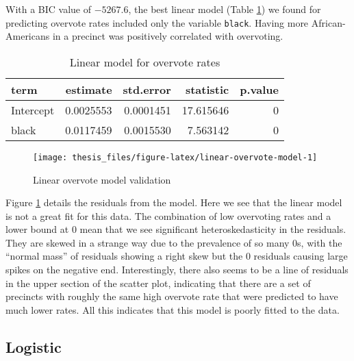 \documentclass[12pt,twoside]{reedthesis}
\begin{document}
With a BIC value of \(-5267.6\), the best linear model (Table \ref{tab:linear-overvote-model}) we found for predicting overvote rates included only the variable \texttt{black}. Having more African-Americans in a precinct was positively correlated with overvoting.
\begin{table}[t]

\caption[Linear overvote model]{\label{tab:linear-overvote-model}Linear model for overvote rates}
\centering
\begin{tabular}{lrrrr}
\toprule
term & estimate & std.error & statistic & p.value\\
\midrule
Intercept & 0.0025553 & 0.0001451 & 17.615646 & 0\\
black & 0.0117459 & 0.0015530 & 7.563142 & 0\\
\bottomrule
\end{tabular}
\end{table}
\begin{figure}
\texttt{[image: thesis\_files/figure-latex/linear-overvote-model-1]} \caption{Linear overvote model validation}\label{fig:linear-overvote-model}
\end{figure}
Figure \ref{fig:linear-overvote-model} details the residuals from the model. Here we see that the linear model is not a great fit for this data. The combination of low overvoting rates and a lower bound at 0 mean that we see significant heteroskedasticity in the residuals. They are skewed in a strange way due to the prevalence of so many 0s, with the ``normal mass'' of residuals showing a right skew but the 0 residuals causing large spikes on the negative end. Interestingly, there also seems to be a line of residuals in the upper section of the scatter plot, indicating that there are a set of precincts with roughly the same high overvote rate that were predicted to have much lower rates. All this indicates that this model is poorly fitted to the data.

\hypertarget{logistic-1}{%
\subsection{Logistic}\label{logistic-1}}
\end{document}
